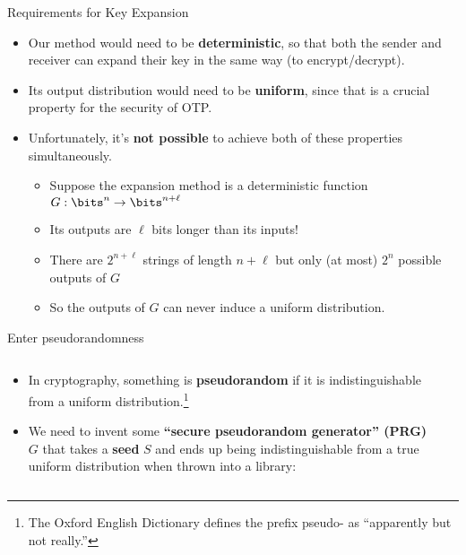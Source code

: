 \documentclass[aspectratio=169, lualatex, handout]{beamer}
\begin{document}
\begin{frame}{Requirements for Key Expansion}
	\begin{itemize}
		\item Our method would need to be \textbf{deterministic}, so that both the sender and receiver can expand their key in the same way (to encrypt/decrypt).
		\item Its output distribution would need to be \textbf{uniform}, since that is a crucial property for the security of OTP.
		\item Unfortunately, it's \textbf{not possible} to achieve both of these properties simultaneously.
		      \begin{itemize}
			      \item Suppose the expansion method is a deterministic function $G: \bits^n \rightarrow \bits^{n+\ell}$
			      \item Its outputs are $\ell$ bits longer than its inputs!
			      \item There are $2^{n+\ell}$ strings of length $n+\ell$ but only (at most) $2^n$ possible outputs of $G$
			      \item So the outputs of $G$ can never induce a uniform distribution.
		      \end{itemize}
	\end{itemize}
\end{frame}

\begin{frame}{Enter pseudorandomness}
	\begin{columns}[c]
		\begin{column}{0.5\textwidth}
			\begin{itemize}
				\item In cryptography, something is \textbf{pseudorandom} if it is indistinguishable from a uniform distribution.\footnote{The Oxford English Dictionary defines the prefix pseudo- as ``apparently but not really.''}
				\item We need to invent some \textbf{``secure pseudorandom generator'' (PRG)} $G$ that takes a \textbf{seed} $S$ and ends up being indistinguishable from a true uniform distribution when thrown into a library:
			\end{itemize}
		\end{column}
		\begin{column}{0.5\textwidth}
		\end{column}
	\end{columns}
\end{frame}
\end{document}
